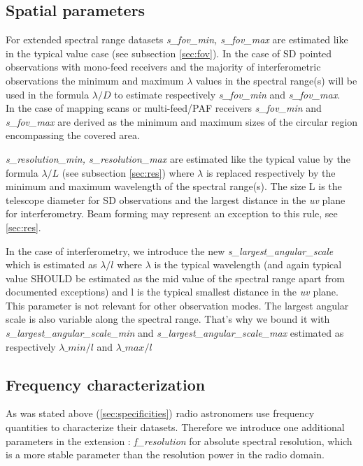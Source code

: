 \documentclass[11pt,a4paper]{ivoa}
\begin{document}
\subsection{Spatial parameters}

For extended spectral range datasets \emph{s\_fov\_min, s\_fov\_max} are estimated like in the typical value case (see subsection \ref{sec:fov}).  
In the case of SD pointed observations with mono-feed receivers and the majority of interferometric observations the minimum and maximum
$\lambda$ values in the spectral range(s) will be used in the formula  $\lambda / D$ to estimate respectively \emph{s\_fov\_min} and  \emph{s\_fov\_max}. \\
In the case of mapping scans or multi-feed/PAF receivers \emph{ s\_fov\_min} and \emph{s\_fov\_max} are derived as the minimum and maximum sizes of the 
circular region encompassing the covered area.

\emph{s\_resolution\_min, s\_resolution\_max} are estimated like the typical value by the formula  $\lambda / L$  (see subsection \ref{sec:res}) where $\lambda$ is replaced respectively by the minimum and maximum wavelength of the spectral range(s). The size L is the telescope diameter for SD observations and the largest distance in the \emph{uv} plane for interferometry. Beam forming may represent an exception to this rule, see \ref{sec:res}.

In the case of interferometry, we introduce the new \emph{s\_largest\_angular\_scale} which is estimated as $\lambda/l$ where $\lambda$ is the typical
wavelength (and again typical value SHOULD be estimated as the mid value of the spectral range apart from documented exceptions) and l is the typical smallest distance in the \emph{uv} plane. This parameter is not relevant for other observation modes.
The largest angular scale is also variable along the spectral range. That's why we bound it with \emph{s\_largest\_angular\_scale\_min} and \emph{s\_largest\_angular\_scale\_max} estimated as  respectively $\lambda\_min/l$ and  $\lambda\_max/l$

\subsection{Frequency characterization}

As was stated above (\ref{sec:specificities}) radio astronomers use frequency quantities to characterize their datasets. Therefore we introduce one additional parameters in the extension : 
\emph{f\_resolution} for absolute spectral resolution, which is a more stable parameter than the resolution power in the radio domain.
\end{document}
